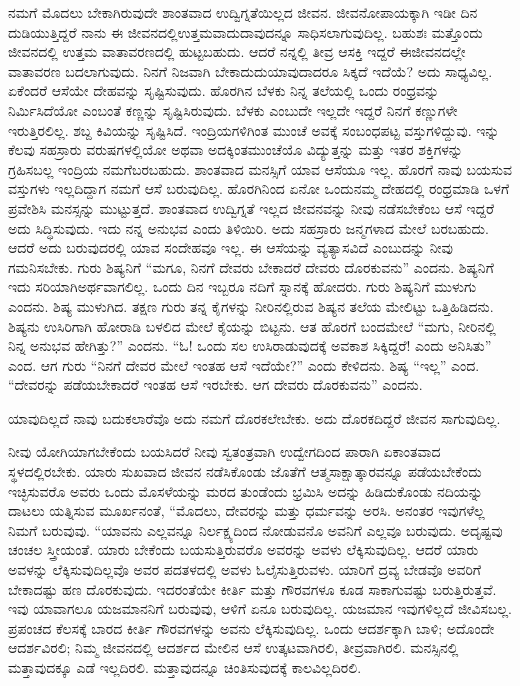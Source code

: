 ನಮಗೆ ಮೊದಲು ಬೇಕಾಗಿರುವುದೇ ಶಾಂತವಾದ ಉದ್ವಿಗ್ನತೆಯಿಲ್ಲದ ಜೀವನ. ಜೀವನೋಪಾಯಕ್ಕಾಗಿ ಇಡೀ ದಿನ ದುಡಿಯುತ್ತಿದ್ದರೆ ನಾನು ಈ ಜೀವನದಲ್ಲಿ\break ಉತ್ತಮವಾದುದಾವುದನ್ನೂ ಸಾಧಿಸಲಾಗುವುದಿಲ್ಲ. ಬಹುಶಃ ಮತ್ತೊಂದು ಜೀವನದಲ್ಲಿ ಉತ್ತಮ ವಾತಾವರಣದಲ್ಲಿ ಹುಟ್ಟಬಹುದು. ಆದರೆ ನನ್ನಲ್ಲಿ ತೀವ್ರ ಆಸಕ್ತಿ ಇದ್ದರೆ ಈ\break ಜೀವನದಲ್ಲೇ ವಾತಾವರಣ ಬದಲಾಗುವುದು. ನಿನಗೆ ನಿಜವಾಗಿ ಬೇಕಾದುದು\break ಯಾವುದಾದರೂ ಸಿಕ್ಕದೆ ಇದೆಯೆ? ಅದು ಸಾಧ್ಯವಿಲ್ಲ. ಏಕೆಂದರೆ ಆಸೆಯೇ ದೇಹವನ್ನು ಸೃಷ್ಟಿಸುವುದು. ಹೊರಗಿನ ಬೆಳಕು ನಿನ್ನ ತಲೆಯಲ್ಲಿ ಒಂದು ರಂಧ್ರವನ್ನು ನಿರ್ಮಿಸಿದೆಯೋ ಎಂಬಂತೆ ಕಣ್ಣನ್ನು ಸೃಷ್ಟಿಸಿರುವುದು. ಬೆಳಕು ಎಂಬುದೇ ಇಲ್ಲದೇ ಇದ್ದರೆ ನಿನಗೆ ಕಣ್ಣುಗಳೇ ಇರುತ್ತಿರಲಿಲ್ಲ. ಶಬ್ದ ಕಿವಿಯನ್ನು ಸೃಷ್ಟಿಸಿದೆ. ಇಂದ್ರಿಯಗಳಿಗಿಂತ ಮುಂಚೆ ಅವಕ್ಕೆ ಸಂಬಂಧಪಟ್ಟ ವಸ್ತುಗಳಿದ್ದುವು. ಇನ್ನು ಕೆಲವು ಸಹಸ್ರಾರು ವರುಷಗಳಲ್ಲಿಯೋ ಅಥವಾ ಅದಕ್ಕಿಂತ\break ಮುಂಚೆಯೊ ವಿದ್ಯುತ್ತನ್ನು ಮತ್ತು ಇತರ ಶಕ್ತಿಗಳನ್ನು ಗ್ರಹಿಸಬಲ್ಲ ಇಂದ್ರಿಯ ನಮಗೆ\break ಬರಬಹುದು. ಶಾಂತವಾದ ಮನಸ್ಸಿಗೆ ಯಾವ ಆಸೆಯೂ ಇಲ್ಲ. ಹೊರಗೆ ನಾವು ಬಯಸುವ ವಸ್ತುಗಳು ಇಲ್ಲದಿದ್ದಾಗ ನಮಗೆ ಆಸೆ ಬರುವುದಿಲ್ಲ. ಹೊರಗಿನಿಂದ ಏನೋ ಒಂದು\break ನಮ್ಮ ದೇಹದಲ್ಲಿ ರಂಧ್ರಮಾಡಿ ಒಳಗೆ ಪ್ರವೇಶಿಸಿ ಮನಸ್ಸನ್ನು ಮುಟ್ಟುತ್ತದೆ. ಶಾಂತವಾದ ಉದ್ವಿಗ್ನತೆ ಇಲ್ಲದ ಜೀವನವನ್ನು ನೀವು ನಡೆಸಬೇಕೆಂಬ ಆಸೆ ಇದ್ದರೆ ಅದು ಸಿದ್ಧಿಸುವುದು. ಇದು ನನ್ನ ಅನುಭವ ಎಂದು ತಿಳಿಯಿರಿ. ಅದು ಸಹಸ್ರಾರು ಜನ್ಮಗಳಾದ ಮೇಲೆ ಬರಬಹುದು. ಆದರೆ ಅದು ಬರುವುದರಲ್ಲಿ ಯಾವ ಸಂದೇಹವೂ ಇಲ್ಲ. ಈ ಆಸೆಯನ್ನು ವ್ಯತ್ಯಾಸವಿದೆ ಎಂಬುದನ್ನು ನೀವು ಗಮನಿಸಬೇಕು. ಗುರು ಶಿಷ್ಯನಿಗೆ “ಮಗೂ, ನಿನಗೆ ದೇವರು ಬೇಕಾದರೆ ದೇವರು ದೊರಕುವನು” ಎಂದನು. ಶಿಷ್ಯನಿಗೆ ಇದು ಸರಿಯಾಗಿ\break ಅರ್ಥವಾಗಲಿಲ್ಲ. ಒಂದು ದಿನ ಇಬ್ಬರೂ ನದಿಗೆ ಸ್ನಾನಕ್ಕೆ ಹೋದರು. ಗುರು ಶಿಷ್ಯನಿಗೆ ಮುಳುಗು ಎಂದನು. ಶಿಷ್ಯ ಮುಳುಗಿದ. ತಕ್ಷಣ ಗುರು ತನ್ನ ಕೈಗಳನ್ನು ನೀರಿನಲ್ಲಿರುವ ಶಿಷ್ಯನ ತಲೆಯ ಮೇಲಿಟ್ಟು ಒತ್ತಿಹಿಡಿದನು. ಶಿಷ್ಯನು ಉಸಿರಿಗಾಗಿ ಹೋರಾಡಿ ಬಳಲಿದ ಮೇಲೆ ಕೈಯನ್ನು ಬಿಟ್ಟನು. ಆತ ಹೊರಗೆ ಬಂದಮೇಲೆ “ಮಗು, ನೀರಿನಲ್ಲಿ ನಿನ್ನ ಅನುಭವ ಹೇಗಿತ್ತು?” ಎಂದನು. “ಓ! ಒಂದು ಸಲ ಉಸಿರಾಡುವುದಕ್ಕೆ ಅವಕಾಶ ಸಿಕ್ಕಿದ್ದರೆ! ಎಂದು ಅನಿಸಿತು” ಎಂದ. ಆಗ ಗುರು “ನಿನಗೆ ದೇವರ ಮೇಲೆ ಇಂತಹ ಆಸೆ ಇದೆಯೇ?” ಎಂದು ಕೇಳಿದನು. ಶಿಷ್ಯ “ಇಲ್ಲ” ಎಂದ. “ದೇವರನ್ನು ಪಡೆಯಬೇಕಾದರೆ ಇಂತಹ ಆಸೆ ಇರಬೇಕು. ಆಗ ದೇವರು ದೊರಕುವನು” ಎಂದನು.

ಯಾವುದಿಲ್ಲದೆ ನಾವು ಬದುಕಲಾರೆವೊ ಅದು ನಮಗೆ ದೊರಕಲೇಬೇಕು. ಅದು ದೊರಕದಿದ್ದರೆ ಜೀವನ ಸಾಗುವುದಿಲ್ಲ.

ನೀವು ಯೋಗಿಯಾಗಬೇಕೆಂದು ಬಯಸಿದರೆ ನೀವು ಸ್ವತಂತ್ರವಾಗಿ ಉದ್ವೇಗದಿಂದ ಪಾರಾಗಿ ಏಕಾಂತವಾದ ಸ್ಥಳದಲ್ಲಿರಬೇಕು. ಯಾರು ಸುಖವಾದ ಜೀವನ ನಡೆಸಿಕೊಂಡು ಜೊತೆಗೆ ಆತ್ಮಸಾಕ್ಷಾತ್ಕಾರವನ್ನೂ ಪಡೆಯಬೇಕೆಂದು ಇಚ್ಛಿಸುವರೊ ಅವರು ಒಂದು ಮೊಸಳೆಯನ್ನು ಮರದ ತುಂಡೆಂದು ಭ್ರಮಿಸಿ ಅದನ್ನು ಹಿಡಿದುಕೊಂಡು ನದಿಯನ್ನು ದಾಟಲು ಯತ್ನಿಸುವ ಮೂರ್ಖನಂತೆ, “ಮೊದಲು, ದೇವರನ್ನು ಮತ್ತು ಧರ್ಮವನ್ನು ಅರಸಿ. ಅನಂತರ ಇವುಗಳೆಲ್ಲ ನಿಮಗೆ ಬರುವುವು. “ಯಾವನು ಎಲ್ಲವನ್ನೂ ನಿರ್ಲಕ್ಷ್ಯದಿಂದ ನೋಡುವನೊ ಅವನಿಗೆ ಎಲ್ಲವೂ ಬರುವುದು. ಅದೃಷ್ಟವು ಚಂಚಲ ಸ್ತ್ರೀಯಂತೆ. ಯಾರು ಬೇಕೆಂದು ಬಯಸುತ್ತಿರುವರೊ ಅವರನ್ನು ಅವಳು ಲೆಕ್ಕಿಸುವುದಿಲ್ಲ. ಆದರೆ ಯಾರು ಅವಳನ್ನು ಲೆಕ್ಕಿಸುವುದಿಲ್ಲವೊ ಅವರ ಪದತಳದಲ್ಲಿ ಅವಳು ಓಲೈಸುತ್ತಿರುವಳು. ಯಾರಿಗೆ ದ್ರವ್ಯ ಬೇಡವೊ ಅವರಿಗೆ ಬೇಕಾದಷ್ಟು ಹಣ ದೊರಕುವುದು. ಇದರಂತೆಯೇ ಕೀರ್ತಿ ಮತ್ತು ಗೌರವಗಳೂ ಕೂಡ ಸಾಕಾಗುವಷ್ಟು ಬರುತ್ತಿರುತ್ತವೆ. ಇವು ಯಾವಾಗಲೂ ಯಜಮಾನನಿಗೆ ಬರುವುವು, ಆಳಿಗೆ ಏನೂ ಬರುವುದಿಲ್ಲ. ಯಜಮಾನ ಇವುಗಳಿಲ್ಲದೆ ಜೀವಿಸಬಲ್ಲ. ಪ್ರಪಂಚದ ಕೆಲಸಕ್ಕೆ ಬಾರದ ಕೀರ್ತಿ ಗೌರವಗಳನ್ನು ಅವನು ಲೆಕ್ಕಿಸುವುದಿಲ್ಲ. ಒಂದು ಆದರ್ಶಕ್ಕಾಗಿ ಬಾಳಿ; ಅದೊಂದೇ ಆದರ್ಶವಿರಲಿ; ನಿಮ್ಮ ಜೀವನದಲ್ಲಿ ಆದರ್ಶದ ಮೇಲಿನ ಆಸೆ ಉತ್ಕಟವಾಗಿರಲಿ, ತೀವ್ರವಾಗಿರಲಿ. ಮನಸ್ಸಿನಲ್ಲಿ ಮತ್ತಾವುದಕ್ಕೂ ಎಡೆ ಇಲ್ಲದಿರಲಿ. ಮತ್ತಾವುದನ್ನೂ ಚಿಂತಿಸುವುದಕ್ಕೆ ಕಾಲವಿಲ್ಲದಿರಲಿ.


